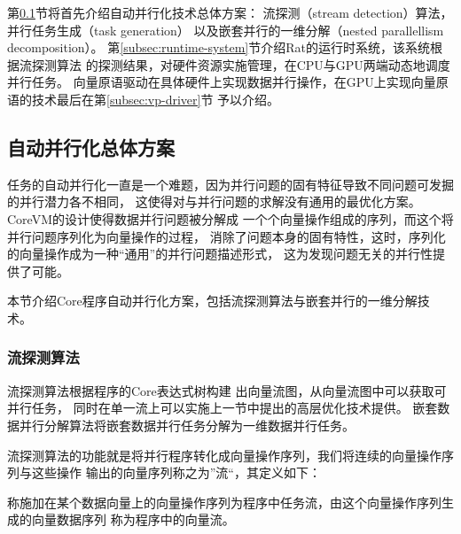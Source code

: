 第\ref{subsec:automated-parallelization}节将首先介绍自动并行化技术总体方案：
流探测（stream detection）算法，并行任务生成（task generation）
以及嵌套并行的一维分解（nested parallellism decomposition）。
第\ref{subsec:runtime-system}节介绍Rat的运行时系统，该系统根据流探测算法
的探测结果，对硬件资源实施管理，在CPU与GPU两端动态地调度并行任务。
向量原语驱动在具体硬件上实现数据并行操作，在GPU上实现向量原语的技术最后在第\ref{subsec:vp-driver}节
予以介绍。

\subsection{自动并行化总体方案}\label{subsec:automated-parallelization}
任务的自动并行化一直是一个难题，因为并行问题的固有特征导致不同问题可发掘的并行潜力各不相同，
这使得对与并行问题的求解没有通用的最优化方案。CoreVM的设计使得数据并行问题被分解成
一个个向量操作组成的序列，而这个将并行问题序列化为向量操作的过程，
消除了问题本身的固有特性，这时，序列化的向量操作成为一种“通用”的并行问题描述形式，
这为发现问题无关的并行性提供了可能。

本节介绍Core程序自动并行化方案，包括流探测算法与嵌套并行的一维分解技术。

\subsubsection{流探测算法}
流探测算法根据程序的Core表达式树构建
出向量流图，从向量流图中可以获取可并行任务，
同时在单一流上可以实施上一节中提出的高层优化技术提供。
嵌套数据并行分解算法将嵌套数据并行任务分解为一维数据并行任务。

流探测算法的功能就是将并行程序转化成向量操作序列，我们将连续的向量操作序列与这些操作
输出的向量序列称之为”流“，其定义如下：
\begin{definition}
  称施加在某个数据向量上的向量操作序列为程序中任务流，由这个向量操作序列生成的向量数据序列
  称为程序中的向量流。
\end{definition}

